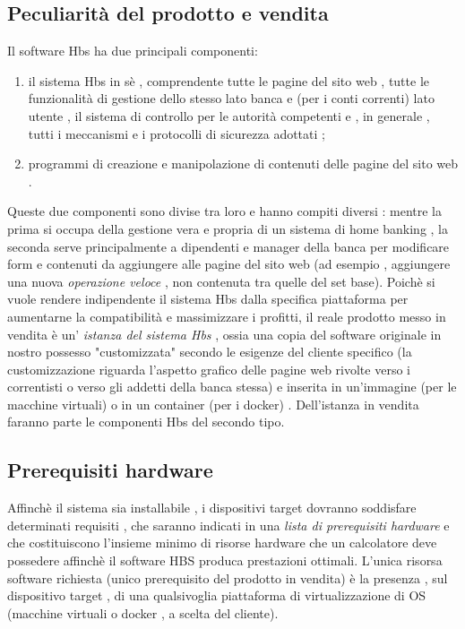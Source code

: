 \subsection{ Peculiarità del prodotto e vendita }
Il software Hbs ha due principali componenti:
\begin{enumerate}
\item il sistema Hbs in sè , comprendente tutte le pagine del sito web , tutte le funzionalità di gestione dello stesso lato banca e (per i conti correnti) lato utente , il sistema di controllo per le autorità competenti e , in generale , tutti i meccanismi e i protocolli di sicurezza adottati ;
\item programmi di creazione e manipolazione di contenuti delle pagine del sito web .
\end{enumerate}
Queste due componenti sono divise tra loro e hanno compiti diversi : mentre la prima si occupa della gestione vera e propria di un sistema di home banking , la seconda serve principalmente a dipendenti e manager della banca per modificare form e contenuti da aggiungere alle pagine del sito web (ad esempio , aggiungere una nuova \emph{operazione veloce }, non contenuta tra quelle del set base).
Poichè si vuole rendere indipendente il sistema Hbs dalla specifica piattaforma per aumentarne la compatibilità e massimizzare i profitti, il reale prodotto messo in vendita è un' \emph{istanza del sistema Hbs} , ossia una copia  del software originale in nostro possesso  "customizzata" secondo le esigenze del cliente specifico (la customizzazione riguarda l'aspetto grafico delle pagine web rivolte verso i correntisti o verso gli addetti della banca stessa) e inserita in un'immagine (per le macchine virtuali) o in un container (per i docker) . Dell'istanza in vendita faranno parte le componenti Hbs del secondo tipo.
 



\subsection{Prerequisiti hardware}
Affinchè il sistema sia installabile , i dispositivi target dovranno soddisfare determinati requisiti , che saranno indicati in una \emph{lista di prerequisiti hardware} e che costituiscono l'insieme minimo di risorse hardware che un calcolatore deve possedere affinchè il software HBS produca prestazioni ottimali.
L'unica risorsa software richiesta (unico prerequisito del prodotto in vendita) è la presenza , sul dispositivo target , di una qualsivoglia piattaforma di virtualizzazione di OS (macchine virtuali o docker , a scelta del cliente).
 









